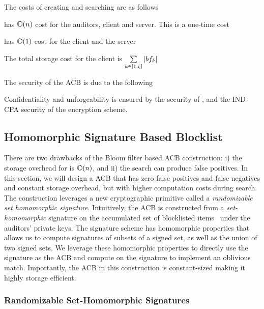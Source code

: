 %
The costs of creating and searching are as follows 

\itemListStart
\item \createBlocklist has $\mathbb{O}(n)$ cost for the auditors, client and server. This is a one-time cost
\item \searchBlocklist has $\mathbb{O}(1)$ cost for the client and the server
\item The total storage cost for the client is $\sum\limits_{\bloomFilterIdx \in [1, \numBins]} |\bloomFilter[\bloomFilterIdx]|$
\itemListEnd 

%
The security of the ACB is due to the following

\itemListStart
\item Confidentiality and unforgeability is ensured by the security of \authOPRFFunc, and the IND-CPA security of the encryption scheme. 
\itemListEnd

\subsection{Homomorphic Signature Based Blocklist}
%
There are two drawbacks of the Bloom filter based ACB construction: i) the storage overhead for \blklistToken is $\mathbb{O}(n)$, and ii) the search can produce false positives. In this section, we will design a ACB that has zero false positives and false negatives and constant storage overhead, but with higher computation costs during search. The construction leverages a new cryptographic primitive called a \emph{randomizable set homomorphic signature}. Intuitively, the ACB is constructed from a \emph{set-homomorphic} signature on the accumulated set of blocklisted items~\cite{johnson2002homomorphic} under the auditors' private keys. The signature scheme has homomorphic properties that allows us to compute signatures of subsets of a signed set, as well as the union of two signed sets. We leverage these homomorphic properties to directly use the signature as the ACB and compute on the signature to implement an oblivious match. Importantly, the ACB in this construction is constant-sized making it highly storage efficient.  



\subsubsection{Randomizable Set-Homomorphic Signatures}
%

